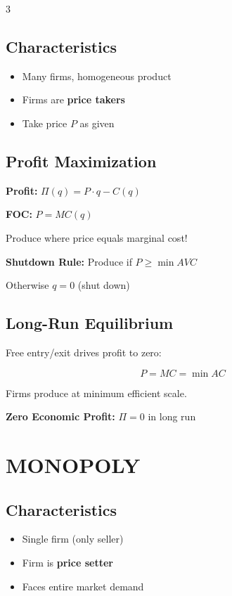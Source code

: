 \documentclass[8pt,landscape,letterpaper]{extarticle}
\begin{document}
\begin{multicols}{3}
\subsection*{Characteristics}
\begin{itemize}
\item Many firms, homogeneous product
\item Firms are \textbf{price takers}
\item Take price $P$ as given
\end{itemize}

\subsection*{Profit Maximization}
\begin{keybox}
\textbf{Profit:} $\Pi(q) = P \cdot q - C(q)$

\textbf{FOC:} $\boxed{P = MC(q)}$

Produce where price equals marginal cost!
\end{keybox}

\textbf{Shutdown Rule:} Produce if $P \geq \min AVC$

Otherwise $q = 0$ (shut down)

\subsection*{Long-Run Equilibrium}
Free entry/exit drives profit to zero:
\begin{keybox}
\[
\boxed{P = MC = \min AC}
\]
\end{keybox}

Firms produce at minimum efficient scale.

\textbf{Zero Economic Profit:} $\Pi = 0$ in long run

\section*{MONOPOLY}

\subsection*{Characteristics}
\begin{itemize}
\item Single firm (only seller)
\item Firm is \textbf{price setter}
\item Faces entire market demand
\end{itemize}


\end{multicols}
\end{document}
